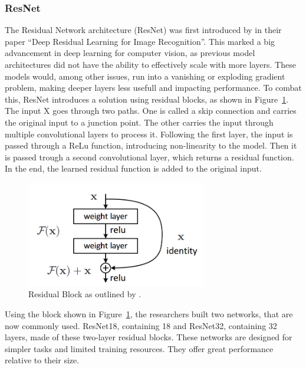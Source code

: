 \subsubsection{ResNet}\label{resnet}
The Residual Network architecture (ResNet) was first introduced by \citep{he2015deep} in their paper ``Deep Residual Learning for Image Recognition''. This marked a big advancement in deep learning for computer vision, as previous model architectures did not have the ability to effectively scale with more layers. These models would, among other issues, run into a vanishing or exploding gradient problem, making deeper layers less usefull and impacting performance. To combat this, ResNet introduces a solution using residual blocks, as shown in Figure~\ref{fig:residualBlock}. The input X goes through two paths. One is called a skip connection and carries the original input to a junction point. The other carries the input through multiple convolutional layers to process it. Following the first layer, the input is passed through a ReLu function, introducing non-linearity to the model. Then it is passed trough a second convolutional layer, which returns a residual function. In the end, the learned residual function is added to the original input.
\begin{figure}[ht]
    \centering
    \includegraphics[width=0.7\textwidth]{figures/ResidualBlock.png}
    \caption{Residual Block as outlined by \citeauthor{he2015deep}.}\label{fig:residualBlock}
\end{figure}

\label{resnet18}
Using the block shown in Figure~\ref{fig:residualBlock}, the researchers built two networks, that are now commonly used. ResNet18, containing 18 and ResNet32, containing 32 layers, made of these two-layer residual blocks. These networks are designed for simpler tasks and limited training resources. They offer great performance relative to their size.

